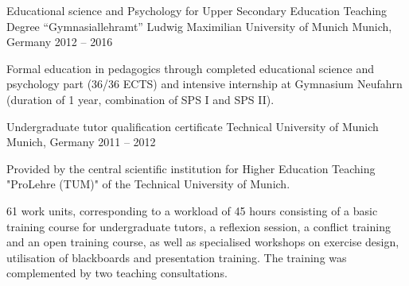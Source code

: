 



\begin{cventries}

      \cventry
      {Educational science and Psychology for Upper Secondary Education Teaching Degree   “Gymnasiallehramt”} %
      {Ludwig Maximilian University of Munich} %
      {Munich, Germany} %
      {2012 -- 2016} %
      {
        \begin{cvitems} %
          \item {Formal education in pedagogics through completed educational science and psychology part (36/36 ECTS) and in­ten­si­ve in­ternship at Gymnasium Neufahrn (duration of 1 year, com­bi­na­ti­on of SPS I and SPS II).}
        \end{cvitems}
      }
  
    \cventry
      {Undergraduate tutor qualification certificate} %
      {Technical University of Munich} %
      {Munich, Germany} %
      {2011 -- 2012} %
      {
        \begin{cvitems} %
          \item {Provided by the central scientific
          institution for Higher Education Teaching "ProLehre (TUM)" of the Technical University of Munich.}
          \item{61 work units, corresponding to a workload of 45 hours consisting of a
          basic training course for undergraduate tutors, a reflexion session, a conflict training and an open training course, as well as specialised workshops on exercise design, utilisation of blackboards and presentation training. The training was complemented by two teaching consultations.}
        \end{cvitems}
      }
  \end{cventries}
  
